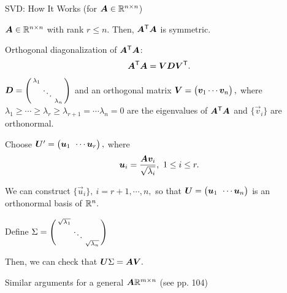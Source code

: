 \documentclass[fleqn,aspectratio=169]{beamer}
\begin{document}
\begin{frame}{SVD: How It Works (for $\bm{A} \in {\mathbb R}^{n \times n}$)}

{
\plitemsep 0.03in
\small
\bci 
\item $\bm{A} \in {\mathbb R}^{n \times n}$ with rank $r \le n.$ Then, ${\bm{A}}^{\mathsf{T}}\bm{A}$ is symmetric. 

\item Orthogonal diagonalization of ${\bm{A}}^{\mathsf{T}}\bm{A}$: 
$${\bm{A}}^{\mathsf{T}}\bm{A} = \bm{V} \bm{D} {\bm{V}}^{\mathsf{T}}.$$
\item $\bm{D} = \left(\begin{smallmatrix}
\lambda_1 & & \cr
 &\ddots & \cr
&& \lambda_n
\end{smallmatrix}\right)$ and an orthogonal matrix $\mV = \rowvec{\vec{v}_1 \cdots \vec{v}_n},$
where $\lambda_1 \ge \cdots \ge \lambda_r \ge \lambda_{r+1} = \cdots \lambda_n =0$ are the eigenvalues of ${\bm{A}}^{\mathsf{T}}\bm{A}$ and $\{\vec{v}_i\}$ are orthonormal.

\item {}
\vspace{-0.2cm}
\eci
}
{
\plitemsep 0.03in
\small
\bci
\item {}

\item Choose $\mU' = \rowvec{\vec{u}_1 & \cdots \vec{u}_r},$ where 
$$\bm{u}_i= \frac{\bm{A} \bm{v}_i}{\sqrt{\lambda_i}}, \ 1\le i \le r.$$

\item We can construct $\{\vec{u}_i\}, \ i = r+1, \cdots, n,$ so that $\mU = \rowvec{\vec{u}_1 & \cdots \vec{u}_n}$ is an orthonormal basis of ${\mathbb R}^{n}.$

\item Define $\Sigma = \left(\begin{smallmatrix}
\sqrt{\lambda_1} & & \cr
 &\ddots & \cr
&& \sqrt{\lambda_n}
\end{smallmatrix}\right)$

\item Then, we can check that $\bm{U} \Sigma = \bm{A} \bm{V}.$

\item Similar arguments for a general $\bm{A} {\mathbb R}^{m \times n}$ (see pp. 104) 
\eci
}

\end{frame}
\end{document}
